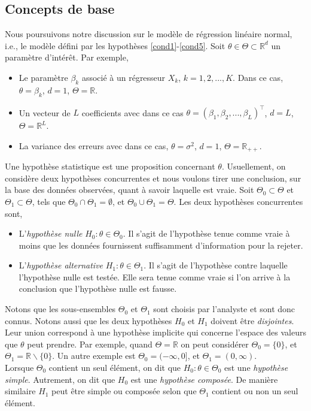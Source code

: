 \documentclass[10pt, reqno]{amsart}
\begin{document}
\subsection{Concepts de base}
Nous poursuivons notre discussion sur le modèle de régression linéaire normal, i.e., le modèle défini par  les hypothèses \ref{cond1}-\ref{cond5}. Soit $\theta\in\Theta\subset \mathbb{R}^d$ un paramètre d'intérêt. Par exemple,
\begin{itemize}[label = - ]
\item Le paramètre $\beta_k$ associé à un régresseur $X_k$, $k=1,2,...,K$. Dans ce cas,
$\theta = \beta_k$, $d=1$, $\Theta = \mathbb{R}$.
\item  Un vecteur de $L$ coefficients avec dans ce cas $\theta = (\beta_1, \beta_2,...,\beta_L)^\top$, $d=L$, $\Theta = \mathbb{R}^L$.
\item La variance des erreurs avec dans ce cas, $\theta = \sigma^2$, $d=1$, $\Theta = \mathbb{R}_{++}$.
\end{itemize}
Une hypothèse statistique est une proposition concernant $\theta$. Usuellement, on considère deux hypothèses concurrentes et nous voulons tirer une conclusion, sur la base des données observées, quant à savoir laquelle est vraie. Soit $\Theta_0\subset\Theta$ et  $\Theta_1\subset\Theta$, tels que $\Theta_0 \cap \Theta_1 = \emptyset$, et $\Theta_0 \cup \Theta_1=\Theta$. Les deux hypothèses concurrentes sont,
\begin{itemize}[label = - ]
\item L'\emph{hypothèse nulle} $H_0: \theta\in \Theta_0$. Il s'agit de l'hypothèse tenue comme vraie à moins que les données fournissent suffisamment d'information pour la rejeter.
\item L'\emph{hypothèse alternative} $H_1: \theta\in \Theta_1$. Il s'agit de l'hypothèse contre laquelle l'hypothèse nulle est testée. Elle sera tenue comme vraie si l'on arrive à la conclusion que l'hypothèse nulle est fausse.
\end{itemize}
Notons que les sous-ensembles $\Theta_0$ et $\Theta_1$ sont choisis par l'analyste et sont donc connus. Notons aussi que les deux hypothèses $H_0$ et $H_1$ doivent être
\emph{disjointes}. Leur union correspond à une hypothèse implicite qui concerne l'espace des valeurs que $\theta$ peut prendre. Par exemple, quand $\Theta = \mathbb{R}$ on peut considérer $\Theta_0 = \{0\}$, et $\Theta_1 = \mathbb{R}  \backslash \{0\}$. Un autre exemple est $\Theta_0 = (-\infty, 0]$, et $\Theta_1 = (0, \infty)$.\\
Lorsque $\Theta_0$ contient un seul élément, on dit que $H_0:\theta\in \Theta_0$ est une \emph{hypothèse simple}. Autrement, on dit que $H_0$ est une \emph{hypothèse composée}. De manière similaire $H_1$ peut être simple ou composée selon que $\Theta_1$ contient ou non un seul élément.\\
\end{document}
